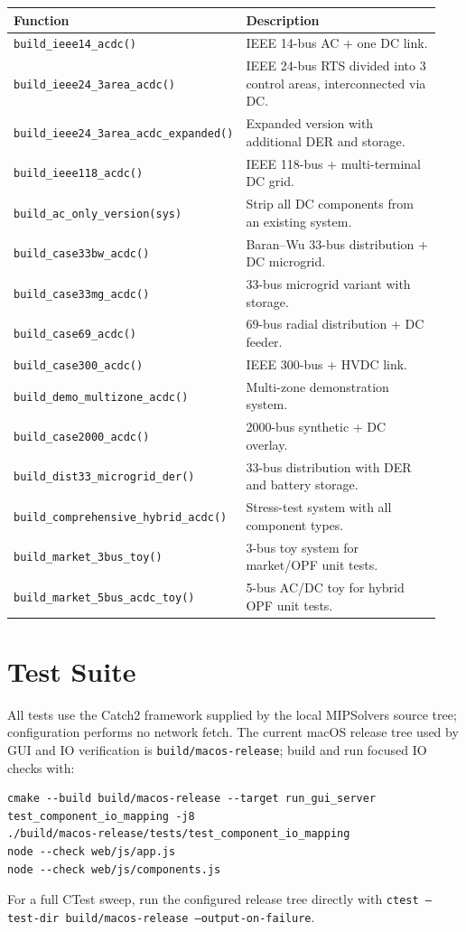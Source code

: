 \begin{longtable}{L{0.44\linewidth}L{0.50\linewidth}}
\toprule
Function & Description \\
\midrule
\endhead
\texttt{build\_ieee14\_acdc()} & IEEE 14-bus AC + one DC link. \\
\texttt{build\_ieee24\_3area\_acdc()} & IEEE 24-bus RTS divided into 3 control areas, interconnected via DC. \\
\texttt{build\_ieee24\_3area\_acdc\_expanded()} & Expanded version with additional DER and storage. \\
\texttt{build\_ieee118\_acdc()} & IEEE 118-bus + multi-terminal DC grid. \\
\texttt{build\_ac\_only\_version(sys)} & Strip all DC components from an existing system. \\
\texttt{build\_case33bw\_acdc()} & Baran--Wu 33-bus distribution + DC microgrid. \\
\texttt{build\_case33mg\_acdc()} & 33-bus microgrid variant with storage. \\
\texttt{build\_case69\_acdc()} & 69-bus radial distribution + DC feeder. \\
\texttt{build\_case300\_acdc()} & IEEE 300-bus + HVDC link. \\
\texttt{build\_demo\_multizone\_acdc()} & Multi-zone demonstration system. \\
\texttt{build\_case2000\_acdc()} & 2000-bus synthetic + DC overlay. \\
\texttt{build\_dist33\_microgrid\_der()} & 33-bus distribution with DER and battery storage. \\
\texttt{build\_comprehensive\_hybrid\_acdc()} & Stress-test system with all component types. \\
\texttt{build\_market\_3bus\_toy()} & 3-bus toy system for market/OPF unit tests. \\
\texttt{build\_market\_5bus\_acdc\_toy()} & 5-bus AC/DC toy for hybrid OPF unit tests. \\
\bottomrule
\end{longtable}

\section{Test Suite}
\label{sec:tests}

All tests use the Catch2 framework supplied by the local MIPSolvers source
tree; configuration performs no network fetch.  The current macOS release tree used by GUI and IO
verification is \texttt{build/macos-release}; build and run focused IO checks
with:
\begin{verbatim}
cmake --build build/macos-release --target run_gui_server test_component_io_mapping -j8
./build/macos-release/tests/test_component_io_mapping
node --check web/js/app.js
node --check web/js/components.js
\end{verbatim}
For a full CTest sweep, run the configured release tree directly with
\texttt{ctest --test-dir build/macos-release --output-on-failure}.

